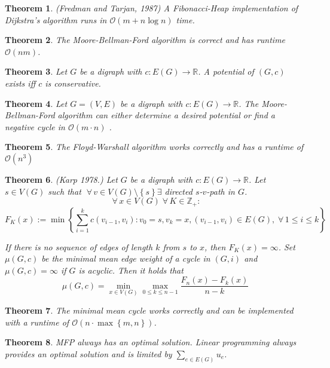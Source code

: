 \documentclass{article}
\newtheorem{theorem}{Theorem}
\newcommand{\set}[1]{\left\{#1\right\}}
\newcommand{\gath}[2]{$#1$-$#2$-path} %
\newcommand{\fall}{\;\forall\,}
\begin{document}
\begin{theorem}\label{satz-3.3}
  (Fredman and Tarjan, 1987)
  A Fibonacci-Heap implementation of Dijkstra's algorithm runs in $\mathcal{O}(m + n\log{n})$ time.
\end{theorem}
\begin{theorem}\label{satz-3.4}
  The Moore-Bellman-Ford algorithm is correct and has runtime $\mathcal{O}(nm)$.
\end{theorem}
\begin{theorem}\label{satz-3.5}
Let $G$ be a digraph with $c: E(G) \rightarrow \mathbb{R}$. A potential of $(G, c)$ exists iff $c$ is conservative.
\end{theorem}
\begin{theorem}\label{korollar-3.5}
  Let $G = (V, E)$ be a digraph with $c: E(G) \rightarrow \mathbb{R}$. The Moore-Bellman-Ford algorithm can either determine a desired potential or find a negative cycle in $\mathcal{O}(m\cdot n)$ .
\end{theorem}
\begin{theorem}\label{satz-3.6}
  The Floyd-Warshall algorithm works correctly and has a runtime of $\mathcal{O}(n^3)$
\end{theorem}
\begin{theorem}\label{satz-3.10}
  (Karp 1978.)
  Let $G$ be a digraph with $c: E(G) \rightarrow \mathbb{R}$. Let $s \in V(G)$ such that $\fall v \in V(G) \setminus \set{s} \exists$ directed \gath sv in $G$.
  \[
    \fall x \in V(G) \fall K \in \mathbb{Z}_+:
  \] \[
    F_K(x) := \min\set{
      \sum_{i=1}^k c(v_{i-1}, v_i):
        v_0 = s, v_k = x, (v_{i-1}, v_i) \in E(G),
        \fall 1 \leq i \leq k
    }
  \]

  If there is no sequence of edges of length $k$ from $s$ to $x$, then $F_K(x) = \infty$.
  Set $\mu(G, c)$ be the minimal mean edge weight of a cycle in $(G, i)$ and $\mu(G, c) = \infty$ if $G$ is acyclic. Then it holds that
  \[
    \mu(G, c) = \min_{x \in V(G)} \max_{0 \leq k \leq n-1} \frac{F_n(x) - F_k(x)}{n-k}
  \]
\end{theorem}
\begin{theorem}\label{korollar-3.11}
  The minimal mean cycle works correctly and can be implemented with a runtime of $\mathcal{O}(n \cdot\max\set{m,n})$.
\end{theorem}
\begin{theorem}
  \label{proposition-4.1}
  MFP always has an optimal solution. Linear programming always provides an optimal solution and is limited by $\sum_{e \in E(G)} u_e$.
\end{theorem}
\end{document}
